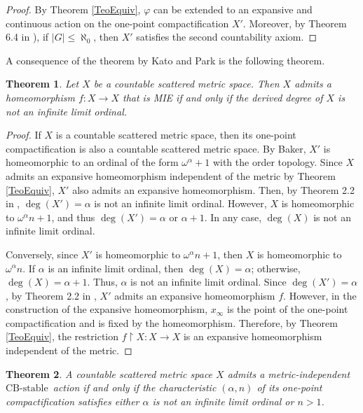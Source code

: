 \documentclass[12pt]{amsart}
\theoremstyle{plain}
\newtheorem{theorem}{Theorem}[section]
\theoremstyle{definition}
\theoremstyle{remark}
\newcommand{\CBstable}{\ensuremath{\mathrm{CB\text{-}stable}}\ }
\begin{document}
\begin{proof}
By Theorem \ref{TeoEquiv}, \(\varphi\) can be extended to an expansive and continuous action on the one-point compactification \(X'\). Moreover, by Theorem 6.4 in \cite{Ferrari2025}), if \(\lvert G \rvert \leq \aleph_0\), then \(X'\) satisfies the second countability axiom.
\end{proof}




A consequence of the theorem by Kato and Park is the following theorem.




\begin{theorem}\label{th:derived-degree-not-limit}
Let \(X\) be a countable scattered metric space.  
Then \(X\) admits a homeomorphism \(f\colon X\to X\) that is MIE if and only if the derived degree of \(X\) is not an infinite limit ordinal.
\end{theorem}


\begin{proof}
If \(X\) is a countable scattered metric space, then its one-point compactification is also a countable scattered metric space. By Baker, \(X'\) is homeomorphic to an ordinal of the form \(\omega^{\alpha} + 1\) with the order topology. Since \(X\) admits an expansive homeomorphism independent of the metric by Theorem \ref{TeoEquiv}, \(X'\) also admits an expansive homeomorphism. Then, by Theorem 2.2 in \cite{Kato}, \( \deg(X') = \alpha \) is not an infinite limit ordinal. However, \(X\) is homeomorphic to \(\omega^{\alpha} n + 1\), and thus \(\deg(X') = \alpha\) or \(\alpha +1\). In any case, \(\deg(X)\) is not an infinite limit ordinal.

Conversely, since \(X'\) is homeomorphic to \(\omega^{\alpha} n + 1\), then \(X\) is homeomorphic to \(\omega^{\alpha} n\). If \(\alpha\) is an infinite limit ordinal, then \(\deg(X) = \alpha\); otherwise, \(\deg(X) = \alpha +1\). Thus, \(\alpha\) is not an infinite limit ordinal. Since \(\deg(X')= \alpha\), by Theorem 2.2 in \cite{Kato}, \(X'\) admits an expansive homeomorphism \(f\). However, in the construction of the expansive homeomorphism, \(x_{\infty}\) is the point of the one-point compactification and is fixed by the homeomorphism. Therefore, by Theorem  \ref{TeoEquiv}, the restriction \( f \upharpoonright X : X \to X \) is an expansive homeomorphism independent of the metric.
\end{proof}



\begin{theorem} 
A countable scattered metric space \(X\) admits a metric-independent \CBstable action if and only if the characteristic \((\alpha, n)\) of its one-point compactification satisfies either \(\alpha\) is not an infinite limit ordinal or \(n > 1\).
\end{theorem}
\end{document}

